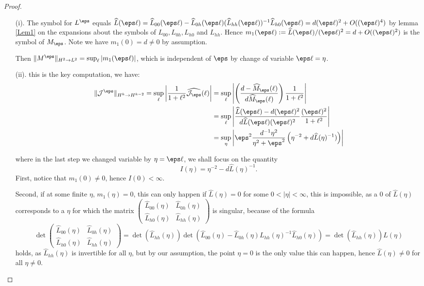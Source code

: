 \begin{proof}
\begin{enumerate}
\item[(i).] The symbol for $L^\eps$ equals $\widehat{L}(\eps\ell)=\widehat{L}_{00}(\eps \ell)-\widehat{L}_{0h}(\eps\ell)(\widehat{L}_{hh}(\eps\ell))^{-1}\widehat{L}_{h0}(\eps\ell) = d(\eps\ell)^2 + O((\eps\ell)^4)$ by lemma \ref{Lem1} on the expansions about the symbols of $L_{00}, L_{0h},L_{h0}$ and $L_{hh}$. Hence $m_1(\eps\ell):=\widehat{L}(\eps\ell)/(\eps\ell)^2=d+O((\eps\ell)^2)$ is the symbol of $M_\eps$. Note we have $m_1(0) = d \neq 0$ by assumption.


Then $\|M^\eps\|_{H^2 \to L^2} = \sup_{\ell} |m_1(\eps\ell)|$, which is independent of $\eps$ by change of variable $\eps\ell = \eta$.

\item[(ii).] this is the key computation, we have: 
\begin{align*}
\| \mathcal{J}^{\eps} \|_{H^k \to H^{k-2}}=\sup_{\ell} \left|\frac{1}{1+\ell^2}\widehat{\mathcal{J}_\eps}(\ell)\right| &= \sup_{\ell} \left|\left( \frac{d-\widehat{M}_\eps(\ell)}{d\widehat{M}_\eps(\ell)}\right) \frac{1}{1+\ell^2}\right|\\
&=\sup_{\ell}\left| \frac{\widehat{L}(\eps \ell)-d(\eps\ell)^2}{d\widehat{L}(\eps\ell)(\eps\ell)^2}\frac{(\eps\ell)^2}{1+\ell^2} \right| \\
&= \sup_{\eta}\left| \eps^2 \frac{d^{-1}\eta^2}{\eta^2+\eps^2}\left(\eta^{-2}+d\widehat{L}(\eta)^{-1})\right)\right|
\end{align*}

where in the last step we changed variable by $\eta = \eps\ell$, we shall focus on the quantity
\[
I(\eta)= \eta^{-2} -d\widehat{L}(\eta)^{-1}.
\]
First, notice that $m_1(0) \neq 0$, hence $I(0) < \infty$.

Second, if at some finite $\eta$, $m_1(\eta) = 0$, this can only happen if $\widehat{L}(\eta) = 0$ for some $0<|\eta|<\infty$, this is impossible, as a $0$ of $\widehat{L}(\eta)$ corresponds to a $\eta$ for which the matrix $\begin{pmatrix}
\widehat{L}_{00}(\eta) &  \widehat{L}_{0h}(\eta) \\
\widehat{L}_{h0}(\eta) & \widehat{L}_{hh}(\eta)
\end{pmatrix}$ is singular, because of the formula  
\[
\det \begin{pmatrix}
\widehat{L}_{00}(\eta) &  \widehat{L}_{0h}(\eta) \\
\widehat{L}_{h0}(\eta) & \widehat{L}_{hh}(\eta)
\end{pmatrix} = \det(\widehat{L}_{hh}(\eta))\det(\widehat{L}_{00}(\eta)-\widehat{L}_{0h}(\eta)L_{hh}(\eta)^{-1}\widehat{L}_{h0}(\eta)) = \det(\widehat{L}_{hh}(\eta)) \widehat{L}(\eta)
\]
holds, as $\widehat{L}_{hh}(\eta)$ is invertible for all $\eta$, but by our assumption, the point $\eta = 0$ is the only value this can happen, hence $\widehat{L}(\eta) \neq 0$ for all $\eta \neq 0$.


\end{enumerate}
\end{proof}
